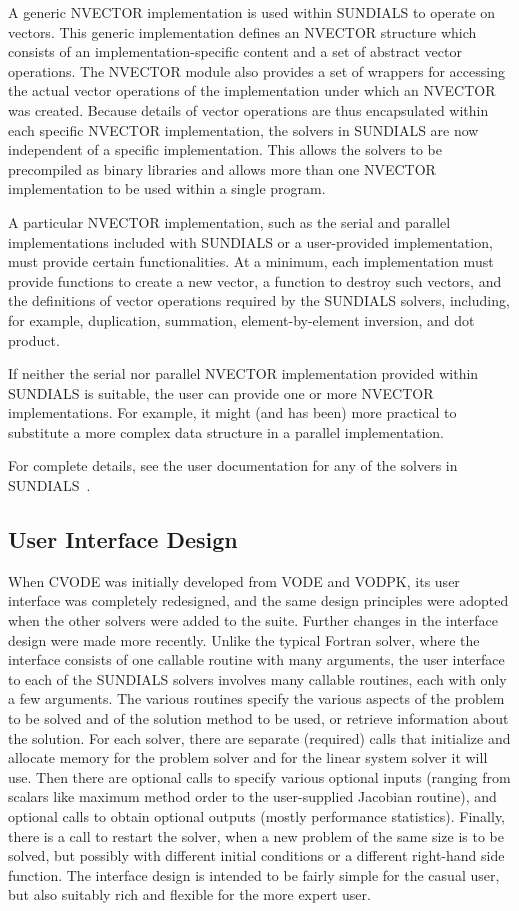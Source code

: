 A generic NVECTOR implementation is used within SUNDIALS to
operate on vectors. This generic implementation defines an NVECTOR
structure which consists of an implementation-specific content and a set 
of abstract vector operations. The NVECTOR module also provides a set of 
wrappers for accessing the actual vector operations of the implementation 
under which an NVECTOR was created. 
Because details of vector operations are thus encapsulated within each specific
NVECTOR implementation, the solvers in SUNDIALS are now independent of a specific
implementation. This allows the solvers to be precompiled as binary
libraries and allows more than one NVECTOR implementation to be used within
a single program.

A particular NVECTOR implementation, such as the serial and parallel
implementations included with SUNDIALS or a user-provided implementation,
must provide certain functionalities. 
At a minimum, each implementation must provide functions to create a new
vector, a function to destroy such vectors, and the definitions of
vector operations required by the SUNDIALS solvers, including, for example, 
duplication, summation, element-by-element inversion, and dot product. 

If neither the serial nor parallel NVECTOR implementation provided within
SUNDIALS is suitable, the user can provide one or more NVECTOR implementations.  
For example, it might (and has been) more practical to substitute a more complex
data structure in a parallel implementation.

For complete details, see the user documentation for any of the solvers in 
SUNDIALS~\cite{HiSe:04cvode,HiSe:04cvodes,HiSe:04ida,HSW:04kinsol}.

\subsection{User Interface Design}

When CVODE was initially developed from VODE and VODPK, its user
interface was completely redesigned, and the same design principles
were adopted when the other solvers were added to the suite.  Further
changes in the interface design were made more recently.  Unlike the
typical Fortran solver, where the interface consists of one callable
routine with many arguments, the user interface to each of the
SUNDIALS solvers involves many callable routines, each with only a few
arguments.  The various routines specify the various aspects of the
problem to be solved and of the solution method to be used, or
retrieve information about the solution.  For each solver, there are
separate (required) calls that initialize and allocate memory for
the problem solver and for the linear system solver it will use.  
Then there are optional calls to specify various
optional inputs (ranging from scalars like maximum method order to the
user-supplied Jacobian routine), and optional calls to obtain optional
outputs (mostly performance statistics).  Finally, there is a call to
restart the solver, when a new problem of the same size is to be
solved, but possibly with different initial conditions or a different
right-hand side function.  The interface design is intended to be
fairly simple for the casual user, but also suitably rich and flexible
for the more expert user.
